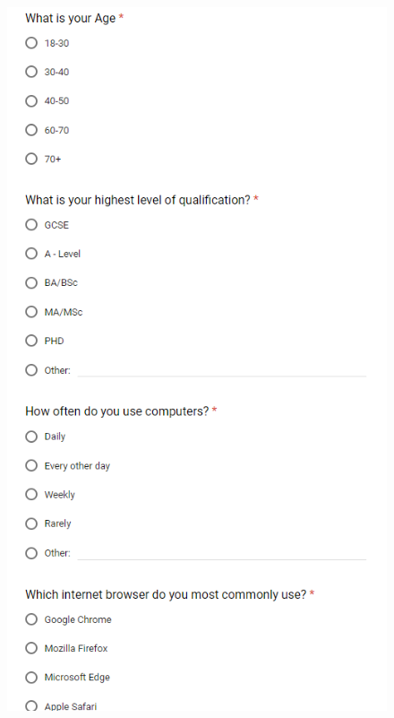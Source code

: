 \begin{figure}[H]
    \includegraphics[width=16cm,height=22cm]{Screenshots/StudyMaterialScreenshots/preStudyQuestionairePT2.png}
\end{figure}

